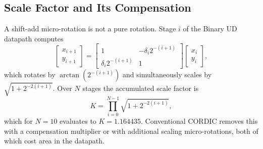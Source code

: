 %
%

\subsection{Scale Factor and Its Compensation}
\label{sec:gain}

A shift-add micro-rotation is not a pure rotation. Stage $i$ of the Binary UD
datapath computes
\begin{equation}
  \begin{bmatrix} x_{i+1} \\ y_{i+1} \end{bmatrix}
  =
  \begin{bmatrix} 1 & -\delta_i 2^{-(i+1)} \\ \delta_i 2^{-(i+1)} & 1 \end{bmatrix}
  \begin{bmatrix} x_i \\ y_i \end{bmatrix},
  \label{eq:stage}
\end{equation}
which rotates by $\arctan(2^{-(i+1)})$ and simultaneously scales by
$\sqrt{1 + 2^{-2(i+1)}}$. Over $N$ stages the accumulated scale factor is
\begin{equation}
  K = \prod_{i=0}^{N-1}\sqrt{1 + 2^{-2(i+1)}},
  \label{eq:gain}
\end{equation}
which for $N = 10$ evaluates to $K = 1.164435$. Conventional CORDIC removes
this with a compensation multiplier or with additional scaling
micro-rotations, both of which cost area in the datapath.

